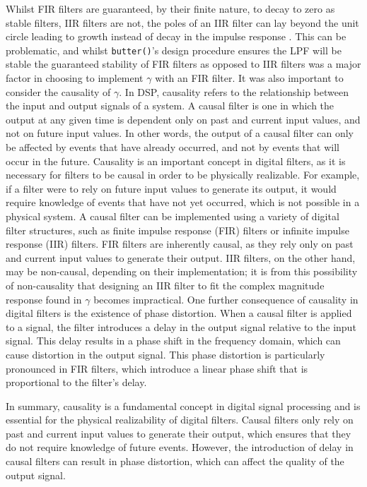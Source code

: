 \documentclass{report}
\begin{document}
            Whilst FIR filters are guaranteed, by their finite nature, to decay to zero as stable filters, IIR filters are not, the poles of an IIR filter can lay beyond the unit circle leading to growth instead of decay in the impulse response \cite{litwin2000fir}.
            This can be problematic, and whilst \texttt{butter()}'s design procedure ensures the LPF will be stable the guaranteed stability of FIR filters as opposed to IIR filters was a major factor in choosing to implement $\gamma$ with an FIR filter. 
            It was also important to consider the causality of $\gamma$.
            In DSP, causality refers to the relationship between the input and output signals of a system.
            A causal filter is one in which the output at any given time is dependent only on past and current input values, and not on future input values.
            In other words, the output of a causal filter can only be affected by events that have already occurred, and not by events that will occur in the future.
            Causality is an important concept in digital filters, as it is necessary for filters to be causal in order to be physically realizable.
            For example, if a filter were to rely on future input values to generate its output, it would require knowledge of events that have not yet occurred, which is not possible in a physical system.
            A causal filter can be implemented using a variety of digital filter structures, such as finite impulse response (FIR) filters or infinite impulse response (IIR) filters.
            FIR filters are inherently causal, as they rely only on past and current input values to generate their output.
            IIR filters, on the other hand, may be non-causal, depending on their implementation; it is from this possibility of non-causality that designing an IIR filter to fit the complex magnitude response found in $\gamma$ becomes impractical. 
            One further consequence of causality in digital filters is the existence of phase distortion.
            When a causal filter is applied to a signal, the filter introduces a delay in the output signal relative to the input signal.
            This delay results in a phase shift in the frequency domain, which can cause distortion in the output signal.
            This phase distortion is particularly pronounced in FIR filters, which introduce a linear phase shift that is proportional to the filter's delay.

In summary, causality is a fundamental concept in digital signal processing and is essential for the physical realizability of digital filters. Causal filters only rely on past and current input values to generate their output, which ensures that they do not require knowledge of future events. However, the introduction of delay in causal filters can result in phase distortion, which can affect the quality of the output signal.
\end{document}
